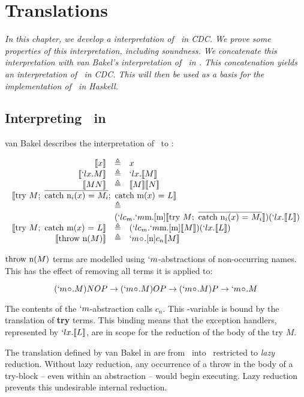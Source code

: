 \chapter{Translations}\label{chapter:translations}

\textit{
In this chapter, we develop a interpretation of \lmu\ in CDC.
We prove some properties of this interpretation, including \emph{soundness}.
We concatenate this interpretation with van Bakel's interpretation of \ltry\ in \lmu.
This concatenation yields an interpretation of \ltry\ in CDC.
This will then be used as a basis for the implementation of \ltry\ in Haskell.
}

\section{Interpreting \ltry\ in \lmu}

van Bakel describes the interpretation of \ltry\ to \lmu \cite{Bakel15}:

{
\[
  \begin{array}{rcl}
    \tr{x} &\triangleq& x \\
    \tr{`lx.M} &\triangleq& `lx.\tr{M} \\
    \tr{M N} &\triangleq& \tr{M}\tr{N} \\
    \multicolumn{3}{l}{\tr{\try M;\ \mcatch;\ \catch{m($x$) = $L$}}} \\
    & \triangleq & \\
    &\multicolumn{2}{l}{ (`lc_m.`m\text{m}.[\text{m}]\tr{\try M;\ \mcatch})(`lx.\tr{L})} \\
    
    \tr{\try M;\ \catch{m($x$) = $L$}} & \triangleq & (`lc_m.`m\text{m}.[\text{m}]\tr{M})(`lx.\tr{L}) \\
    \tr{\throw{n($M$)}} &\triangleq& `m\nonocc.[\text{n}]c_n\tr{M}
  \end{array}
\]
}

$\text{throw n($M$)}$ terms are modelled using $`m$-abstractions of non-occurring names. This has the effect of removing all terms it is applied to:

\[
  (`m\nonocc.M)NOP \to (`m\nonocc.M)OP \to (`m\nonocc.M)P \to `m\nonocc.M
\]

The contents of the $`m$-abstraction calls $c_n$.
This \lam-variable is bound by the translation of \textbf{try} terms.
This binding means that the exception handlers, represented by $`lx.\llbracket L \rrbracket$,
are in scope for the reduction of the body of the try $M$.

The translation defined by van Bakel in \cite{Bakel15} are from \ltry\ into \lmu\ restricted to \emph{lazy} reduction.
Without lazy reduction, any occurrence of a throw in the body of a try-block -- even within an abstraction -- would begin executing.
Lazy reduction prevents this undesirable internal reduction. 

